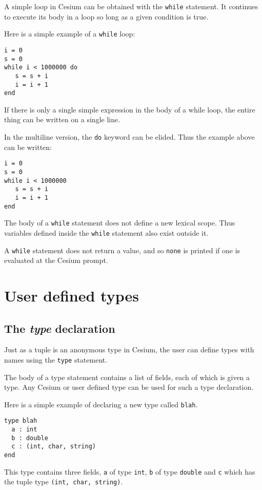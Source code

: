 \documentclass[a4paper,10pt]{article}
\newcommand{\code}{\lstinline}
\begin{document}
{A simple loop in Cesium can be obtained with the \code{while} statement. It continues to execute its
body in a loop so long as a given condition is true.

Here is a simple example of a \code{while} loop:

\begin{lstlisting}
i = 0
s = 0
while i < 1000000 do
   s = s + i
   i = i + 1
end
\end{lstlisting}

If there is only a single simple expression in the body of a while loop, the entire thing can be
written on a single line. 

In the multiline version, the \code{do} keyword can be elided. Thus the example above can be written:

\begin{lstlisting}
i = 0
s = 0
while i < 1000000
   s = s + i
   i = i + 1
end
\end{lstlisting}

The body of a \code{while} statement does not define a new lexical scope. Thus variables defined 
inside the \code{while} statement also exist outside it.

A \code{while} statement does not return a value, and so \code{none} is printed if one is evaluated
at the Cesium prompt.

\section{User defined types}

\subsection{The \textit{type} declaration}

Just as a tuple is an anonymous type in Cesium, the user can define types with names using the
\code{type} statement.

The body of a type statement contains a list of fields, each of which is given a type. Any Cesium
or user defined type can be used for such a type declaration.

Here is a simple example of declaring a new type called \code{blah}.

\begin{lstlisting}
type blah
  a : int
  b : double
  c : (int, char, string)
end
\end{lstlisting}

This type contains three fields, \code{a} of type \code{int}, \code{b} of type \code{double} and
\code{c} which has the tuple type \code{(int, char, string)}.

}
\end{document}

